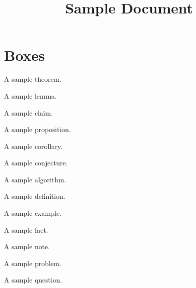 \documentclass{mszreport}
\title{Sample Document}
\begin{document}
\maketitle

\chapter{Boxes}

\begin{theorem}
    A sample theorem.
\end{theorem}

\begin{lemma}
    A sample lemma.
\end{lemma}

\begin{claim}
    A sample claim.
\end{claim}

\begin{proposition}
    A sample proposition.
\end{proposition}

\begin{corollary}
    A sample corollary.
\end{corollary}

\begin{conjecture}
    A sample conjecture.
\end{conjecture}

\begin{algorithm}
    A sample algorithm.
\end{algorithm}

\begin{definition}
    A sample definition.
\end{definition}

\begin{example}
    A sample example.
\end{example}

\begin{fact}
    A sample fact.
\end{fact}

\begin{note}
    A sample note.
\end{note}

\begin{problem}
    A sample problem.
\end{problem}

\begin{question}
    A sample question.
\end{question}
\end{document}
